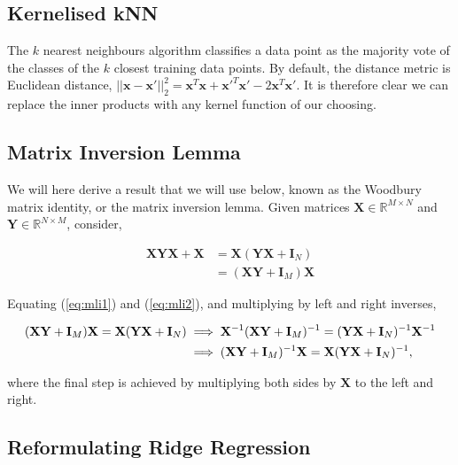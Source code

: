 \documentclass[11pt]{amsart}
\begin{document}
\subsection{Kernelised kNN}

The $k$ nearest neighbours algorithm classifies a data point as the majority vote of the classes of the $k$ closest training data points. By default, the distance metric is Euclidean distance, $||\mathbf{x} - \mathbf{x}'||_2^2 = \mathbf{x}^T\mathbf{x} + \mathbf{x}'^T\mathbf{x}' - 2\mathbf{x}^T\mathbf{x}'$. It is therefore clear we can replace the inner products with any kernel function of our choosing.

\subsection{Matrix Inversion Lemma}

We will here derive a result that we will use below, known as the Woodbury matrix identity, or the matrix inversion lemma. Given matrices $\mathbf{X} \in \mathbb{R}^{M\times N}$ and $\mathbf{Y} \in \mathbb{R}^{N\times M}$, consider,

\begin{align}
\mathbf{X}\mathbf{Y}\mathbf{X} + \mathbf{X} &= \mathbf{X}(\mathbf{Y}\mathbf{X} + \mathbf{I}_N) \label{eq:mli1} \\
&= (\mathbf{X}\mathbf{Y} + \mathbf{I}_M)\mathbf{X} \label{eq:mli2}
\end{align}

Equating (\ref{eq:mli1}) and (\ref{eq:mli2}), and multiplying by left and right inverses,

\begin{align}
(\mathbf{X}\mathbf{Y} + \mathbf{I}_M)\mathbf{X} = \mathbf{X}(\mathbf{Y}\mathbf{X} + \mathbf{I}_N) &\implies \mathbf{X}^{-1}(\mathbf{X}\mathbf{Y} + \mathbf{I}_M)^{-1} = (\mathbf{Y}\mathbf{X} + \mathbf{I}_N)^{-1}\mathbf{X}^{-1}\notag\\
&\implies (\mathbf{X}\mathbf{Y} + \mathbf{I}_M)^{-1}\mathbf{X} =  \mathbf{X}(\mathbf{Y}\mathbf{X} + \mathbf{I}_N)^{-1},\notag
\end{align}

where the final step is achieved by multiplying both sides by $\mathbf{X}$ to the left and right.

\subsection{Reformulating Ridge Regression}
\end{document}
